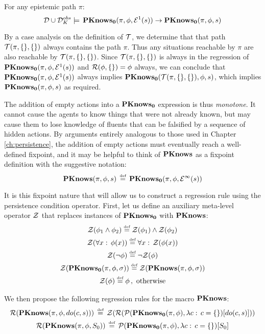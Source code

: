 \begin{thm}
\label{thm:En_impl_En-1}For any epistemic path $\pi$: \[
\mathcal{D}\cup\mathcal{D}_{K}^{obs}\models\,\mathbf{PKnows_{0}}(\pi,\phi,\mathcal{E}^{1}(s))\rightarrow\mathbf{PKnows_{0}}(\pi,\phi,s)\]

\end{thm}
\begin{proofsketch}
By a case analysis on the definition of $\mathcal{T}$, we determine that
that path $\mathcal{T}(\pi,\{\},\{\})$ always contains the path $\pi$.
Thus any situations reachable by $\pi$ are also reachable by $\mathcal{T}(\pi,\{\},\{\})$.
Since $\mathcal{T}(\pi,\{\},\{\})$ is always in the regression of $\mathbf{PKnows_{0}}(\pi,\phi,\mathcal{E}^{1}(s))$
and $\mathcal{R}(\phi,\{\})=\phi$ always, we can conclude that $\mathbf{PKnows_{0}}(\pi,\phi,\mathcal{E}^{1}(s))$
always implies $\mathbf{PKnows_{0}}(\mathcal{T}(\pi,\{\},\{\}),\phi,s)$, which implies
$\mathbf{PKnows_{0}}(\pi,\phi,s)$ as required. 
\end{proofsketch}
The addition of empty actions into a $\mathbf{PKnows_{0}}$ expression is thus
\emph{monotone}. It cannot cause the agents to know things that were
not already known, but may cause them to lose knowledge of fluents
that can be falsified by a sequence of hidden actions. By arguments
entirely analogous to those used in Chapter \eqref{ch:persistence},
the addition of empty actions must eventually reach a well-defined
fixpoint, and it may be helpful to think of $\mathbf{PKnows}$ as a fixpoint
definition with the suggestive notation:\[
\mathbf{PKnows}(\pi,\phi,s)\,\stackrel{\mbox{\tiny def}}{=}\,\mathbf{PKnows_{0}}(\pi,\phi,\mathcal{E}^{\infty}(s))\]


It is this fixpoint nature that will allow us to construct a regression
rule using the persistence condition operator. First, let us define
an auxiliary meta-level operator $\mathcal{Z}$ that replaces instances of
$\mathbf{PKnows_{0}}$ with $\mathbf{PKnows}$:\begin{gather*}
\mathcal{Z}(\phi_{1}\wedge\phi_{2})\stackrel{\mbox{\tiny def}}{=}\mathcal{Z}(\phi_{1})\wedge\mathcal{Z}(\phi_{2})\\
\mathcal{Z}(\forall x:\,\phi(x))\stackrel{\mbox{\tiny def}}{=}\forall x:\,\mathcal{Z}(\phi(x))\\
\mathcal{Z}(\neg\phi)\stackrel{\mbox{\tiny def}}{=}\neg\mathcal{Z}(\phi)\\
\mathcal{Z}(\mathbf{PKnows_{0}}(\pi,\phi,\sigma))\stackrel{\mbox{\tiny def}}{=}\mathcal{Z}(\mathbf{PKnows}(\pi,\phi,\sigma))\\
\mathcal{Z}(\phi)\stackrel{\mbox{\tiny def}}{=}\phi\,,\,\,\mathrm{otherwise}\end{gather*}


We then propose the following regression rules for the macro $\mathbf{PKnows}$:\begin{gather}
\mathcal{R}(\mathbf{PKnows}(\pi,\phi,do(c,s)))\,\stackrel{\mbox{\tiny def}}{=}\,\mathcal{Z}(\mathcal{R}(\mathcal{P}(\mathbf{PKnows_{0}}(\pi,\phi),\lambda c:\, c=\{\})[do(c,s)]))\label{eq:Reg_PKnows_do}\\
\mathcal{R}(\mathbf{PKnows}(\pi,\phi,S_{0}))\,\stackrel{\mbox{\tiny def}}{=}\,\mathcal{P}(\mathbf{PKnows_{0}}(\pi,\phi),\lambda c:\, c=\{\})[S_{0}]\label{eq:Reg_PKnows_S0}\end{gather}


